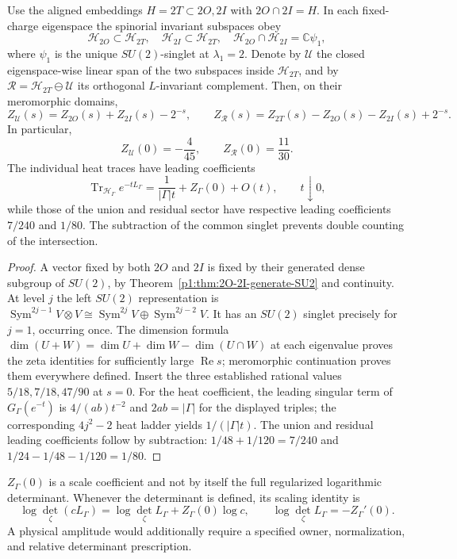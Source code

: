 \documentclass[11pt]{article}
\begin{document}
\begin{theorem}
\label{p1b:thm:v11-spinorial-overlap-zeta}
Use the aligned embeddings $H=2T\subset2O,2I$ with
$2O\cap2I=H$.  In each fixed-charge eigenspace the spinorial
invariant subspaces obey
\[
\mathscr H_{2O}\subset\mathscr H_{2T},\quad
\mathscr H_{2I}\subset\mathscr H_{2T},\quad
\boxed{\mathscr H_{2O}\cap\mathscr H_{2I}=\mathbb C\psi_1,}
\]
where $\psi_1$ is the unique $SU(2)$-singlet at $\lambda_1=2$.
Denote by $\mathscr U$ the closed eigenspace-wise linear span of the
two subspaces inside $\mathscr H_{2T}$, and by
$\mathscr R=\mathscr H_{2T}\ominus\mathscr U$ its orthogonal
$L$-invariant complement.  Then, on their meromorphic domains,
\[
\boxed{Z_{\mathscr U}(s)=Z_{2O}(s)+Z_{2I}(s)-2^{-s},\qquad
Z_{\mathscr R}(s)=Z_{2T}(s)-Z_{2O}(s)-Z_{2I}(s)+2^{-s}.}
\]
In particular,
\[
\boxed{Z_{\mathscr U}(0)=-\frac4{45},\qquad
Z_{\mathscr R}(0)=\frac{11}{30}.}
\]
The individual heat traces have leading coefficients
\[
\operatorname{Tr}_{\mathscr H_\Gamma}e^{-tL_\Gamma}
=\frac1{|\Gamma|t}+Z_\Gamma(0)+O(t),\qquad t\downarrow0,
\]
while those of the union and residual sector have respective leading
coefficients $7/240$ and $1/80$.  The subtraction of the common
singlet prevents double counting of the intersection.
\end{theorem}
\begin{proof}
A vector fixed by both $2O$ and $2I$ is fixed by their generated
dense subgroup of $SU(2)$, by
Theorem~\ref{p1:thm:2O-2I-generate-SU2} and continuity.
At level $j$ the left $SU(2)$ representation is
$\operatorname{Sym}^{2j-1}V\otimes V\cong
\operatorname{Sym}^{2j}V\oplus\operatorname{Sym}^{2j-2}V$.
It has an $SU(2)$ singlet precisely for $j=1$, occurring once.
The dimension formula
$\dim(U+W)=\dim U+\dim W-\dim(U\cap W)$ at each eigenvalue
proves the zeta identities for sufficiently large $\operatorname{Re}s$;
meromorphic continuation proves them everywhere defined.  Insert the
three established rational values $5/18,7/18,47/90$ at $s=0$.
For the heat coefficient, the leading singular term of
$G_\Gamma(e^{-t})$ is $4/(ab)t^{-2}$ and
$2ab=|\Gamma|$ for the displayed triples; the corresponding
$4j^2-2$ heat ladder yields $1/(|\Gamma|t)$.
The union and residual leading coefficients follow by subtraction:
$1/48+1/120=7/240$ and
$1/24-1/48-1/120=1/80$.
\end{proof}

\begin{remark}
\label{p1b:rem:v11-zeta-scaling}
$Z_\Gamma(0)$ is a scale coefficient and not by itself the full
regularized logarithmic determinant.  Whenever the determinant is
defined, its scaling identity is
\[
\log\det_{\zeta}(cL_\Gamma)
 =\log\det_{\zeta}L_\Gamma+Z_\Gamma(0)\log c,
\qquad\log\det_{\zeta}L_\Gamma=-Z_\Gamma'(0).
\]
A physical amplitude would additionally require a specified owner,
normalization, and relative determinant prescription.
\end{remark}
\end{document}
